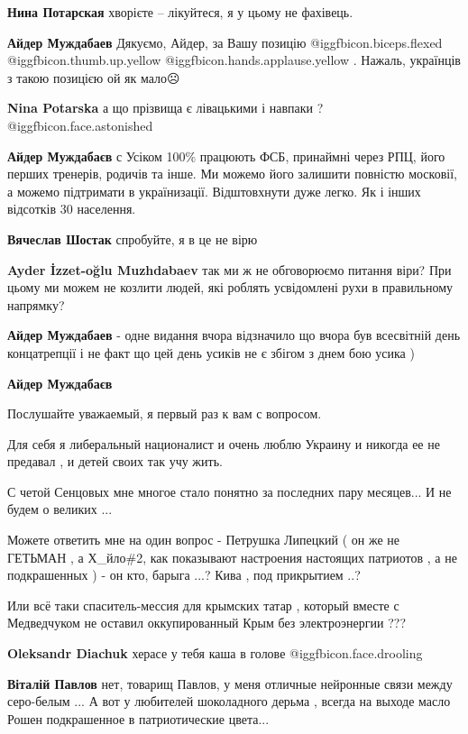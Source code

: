 \begin{itemize}
\begin{itemize}

\textbf{Нина Потарская} хворієте – лікуйтеся, я у цьому не фахівець.

\textbf{Айдер Муждабаев} Дякуємо, Айдер, за Вашу позицію @igg{fbicon.biceps.flexed}  @igg{fbicon.thumb.up.yellow}  @igg{fbicon.hands.applause.yellow} . Нажаль, українців з такою позицією ой як мало☹️

\textbf{Nina Potarska} а що прізвища є лівацькими і навпаки ?  @igg{fbicon.face.astonished} 

\textbf{Айдер Муждабаєв} с Усіком 100\% працюють ФСБ, принаймні через РПЦ, його перших тренерів, родичів та інше. Ми можемо його залишити повністю московії, а можемо підтримати в українизації. Відштовхнути дуже легко.
Як і інших відсотків 30 населення.


\textbf{Вячеслав Шостак} спробуйте, я в це не вірю

\textbf{Ayder İzzet-oğlu Muzhdabaev} так ми ж не обговорюємо питання віри? При цьому ми можем не козлити людей, які роблять усвідомлені рухи в правильному напрямку?

\textbf{Айдер Муждабаев} - одне видання вчора відзначило що вчора був всесвітній день концатрепції і не факт що цей день усиків не є збігом з днем бою усика )

\textbf{Айдер Муждабаєв} 

Послушайте уважаемый, я первый раз к вам с вопросом.

Для себя я либеральный националист и очень люблю Украину и никогда ее не
предавал , и детей своих так учу жить.

С четой Сенцовых мне многое стало понятно за последних пару месяцев... И не
будем о великих ...

Можете ответить мне на один вопрос - Петрушка Липецкий ( он же не ГЕТЬМАН , а
Х\_йло\#2, как показывают настроения настоящих патриотов , а не подкрашенных ) -
он кто, барыга ...? Кива , под прикрытием ..?

Или всё таки спаситель-мессия для крымских татар , который вместе с Медведчуком
не оставил оккупированный Крым без электроэнергии ???

\textbf{Oleksandr Diachuk} херасе у тебя каша в голове  @igg{fbicon.face.drooling} 

\textbf{Віталій Павлов} нет, товарищ Павлов, у меня отличные нейронные связи между серо-белым ... А вот у любителей шоколадного дерьма , всегда на выходе масло Рошен подкрашенное в патриотические цвета...


\end{itemize}
\end{itemize}
